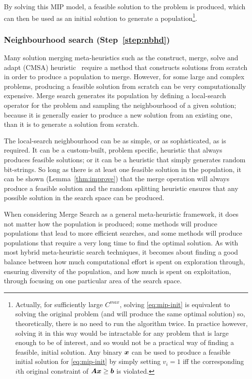 \documentclass[journal]{IEEEtran}
\begin{document}
By solving this MIP model, a feasible solution to the problem is produced, which can then be used as an initial solution to generate a population\footnote{Actually, for sufficiently large \(C^{max}\), solving \eqref{eq:mip-init} is equivalent to solving the original problem (and will produce the same optimal solution) so, theoretically, there is no need to run the algorithm twice. In practice however, solving it in this way would be intractable for any problem that is large enough to be of interest, and so would not be a practical way of finding a feasible, initial solution. Any binary \(\boldsymbol{x}\) can be used to produce a feasible initial solution for \eqref{eq:mip-init} by simply setting \(v_i=1\) iff the corresponding \(i\)th original constraint of \(\boldsymbol{A} \boldsymbol{x} \ge \boldsymbol{b}\) is violated.}.

\subsubsection*{Neighbourhood search (Step~\ref{step:nbhd})}

Many solution merging meta-heuristics such as the construct, merge, solve and adapt (CMSA) heuristic~\cite{Blum2016} require a method that constructs solutions from scratch in order to produce a population to merge. However, for some large and complex problems, producing a feasible solution from scratch can be very computationally expensive. Merge search generates its population by defining a local-search operator for the problem and sampling the neighbourhood of a given solution; because it is generally easier to produce a new solution from an existing one, than it is to generate a solution from scratch. 

The local-search neighbourhood can be as simple, or as sophisticated, as is required. It can be a custom-built, problem specific, heuristic that always produces feasible solutions; or it can be a heuristic that simply generates random bit-strings. So long as there is at least one feasible solution in the population, it can be shown (Lemma~\ref{thm:improve}) that the merge operation will always produce a feasible solution and the random splitting heuristic ensures that any possible solution in the search space can be produced.

When considering Merge Search as a general meta-heuristic framework, it does not matter how the population is produced; some methods will produce populations that lead to more efficient searches, and some methods will produce populations that require a very long time to find the optimal solution. As with most hybrid meta-heuristic search techniques, it becomes about finding a good balance between how much computational effort is spent on exploration through, ensuring diversity of the population, and how much is spent on exploitation, through focusing on one particular area of the search space.
\end{document}
